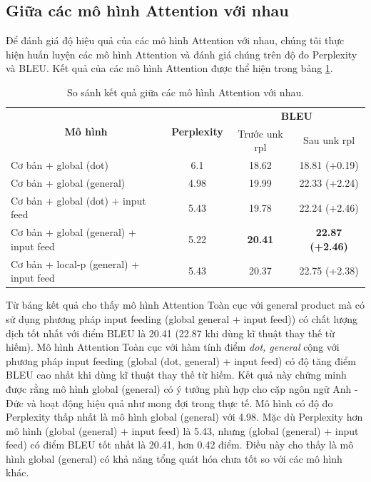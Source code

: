 \subsection{Giữa các mô hình Attention với nhau}
Để đánh giá độ hiệu quả của các mô hình Attention với nhau, chúng tôi thực hiện huấn luyện các mô hình Attention và đánh giá chúng trên độ đo Perplexity và BLEU. Kết quả của các mô hình Attention được thể hiện trong bảng \ref{tab_attn-vs-attn}. 



\begin{table}
	\centering
	\caption{So sánh kết quả giữa các mô hình Attention với nhau.}
	\begin{tabular}{|l|c|c|c|} 
		\hline
		\multicolumn{1}{|c|}{\multirow{2}{*}{ \textbf{Mô hình} }} & \multirow{2}{*}{\textbf{Perplexity } } & \multicolumn{2}{c|}{\textbf{BLEU } }       \\ 
		\cline{3-4}
		\multicolumn{1}{|c|}{}                                    &                                        & Trước unk rpl   & Sau unk rpl              \\ 
		\hline
		Cơ bản + global (dot)                                     & 6.1                                    & 18.62           & 18.81 (+0.19)            \\ 
		\hline
		Cơ bản + global (general)                                 & 4.98                                   & 19.99           & 22.33 (+2.24)            \\ 
		\hline
		Cơ bản + global (dot) + input feed                        & 5.43                                   & 19.78           & 22.24 (+2.46)            \\ 
		\hline
		Cơ bản + global (general) + input feed                    & 5.22                                   & \textbf{20.41}  & \textbf{22.87 (+2.46)}   \\ 
		\hline
		Cơ bản + local-p (general) + input feed                   & 5.43                                   & 20.37           & 22.75 (+2.38)            \\
		\hline
	\end{tabular}
	\label{tab_attn-vs-attn}
\end{table}

Từ bảng kết quả cho thấy mô hình Attention Toàn cục với general product mà có sử dụng phương pháp input feeding (global general + input feed)) có chất lượng dịch tốt nhất với điểm BLEU là 20.41 (22.87 khi dùng kĩ thuật thay thế từ hiếm). Mô hình Attention Toàn cục với hàm tính điểm \textit{dot, general} cộng với phương pháp input feeding (global (dot, general) + input feed) có độ tăng điểm BLEU cao nhất khi dùng kĩ thuật thay thế từ hiếm. Kết quả này chứng minh được rằng mô hình global (general) có ý tưởng phù hợp cho cặp ngôn ngữ Anh - Đức và hoạt động hiệu quả như mong đợi trong thực tế.  Mô hình có độ đo Perplexity thấp nhất là mô hình global (general) với 4.98. Mặc dù Perplexity hơn mô hình (global (general) + input feed) là 5.43, nhưng (global (general) + input feed) có điểm BLEU tốt nhất là 20.41, hơn 0.42 điểm. Điều này cho thấy là mô hình global (general) có khả năng tổng quát hóa chưa tốt so với các mô hình khác.
 
